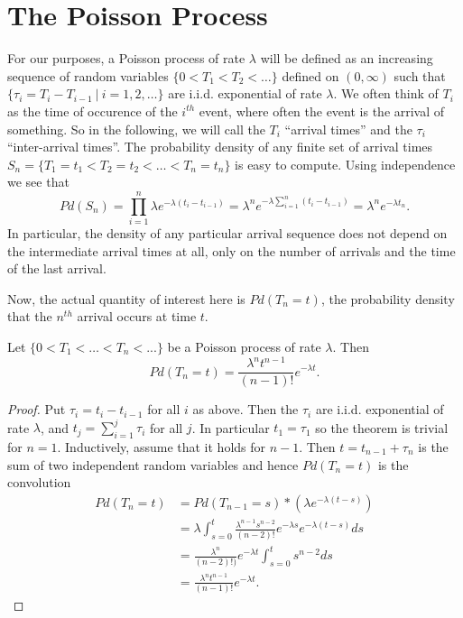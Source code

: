 \documentclass[12pt,leqno]{article}
\begin{document}
\section{The Poisson Process}
For our purposes, a Poisson process of rate $\lambda$ will be defined as an increasing sequence of random variables
$ \{0 < T_1 < T_2 < \dots\}$ defined on $(0,\infty)$ such that $\{\tau_i = T_i-T_{i-1}~|~ i = 1,2,\dots\}$ are i.i.d.
exponential of rate $\lambda$. We often think of $T_i$ as the time of occurence of the $i^{th}$
event, where often the event is the arrival of something.  So in the following, we will call the $T_i$
``arrival times'' and the $\tau_i$ ``inter-arrival times''.  The probability density of any finite set of arrival times
$S_n = \{T_1 = t_1 < T_2 = t_2<\dots<T_n = t_n\}$ is easy to compute. Using independence we see that
\begin{equation}\label{arr_seq}
Pd(S_n) = \prod_{i=1}^n\lambda{e}^{-\lambda(t_i - t_{i-1})} = \lambda^ne^{-\lambda\sum_{i = 1}^n(t_i-t_{i-1})} = \lambda^ne^{-\lambda{t_n}}.
\end{equation}
In particular, the density of any particular arrival sequence does not depend on the intermediate arrival times
at all, only on the number of arrivals and the time of the last arrival.

Now, the actual quantity of interest here
is $Pd(T_n = t)$, the probability density that the $n^{th}$ arrival occurs at time $t$.
\begin{Thm}
  Let $\{0 < T_1<\dots<T_n<... \}$ be a Poisson process of rate $\lambda$.  Then
  \begin{equation}\label{erlang}
  Pd(T_n = t) = \frac{\lambda^nt^{n-1}}{(n-1)!}e^{-\lambda{t}}.
  \end{equation}
  \begin{proof}
    Put $\tau_i = t_i - t_{i-1}$ for all $i$ as above. Then the $\tau_i$ are i.i.d. exponential of rate $\lambda$, and
    $t_j = \sum_{i=1}^j \tau_i$ for all $j$.  In particular $t_1 = \tau_1$ so the theorem is trivial for $n = 1$.
    Inductively, assume that it holds for $n-1$. Then $t = t_{n-1} + \tau_n$ is the sum of two independent random
    variables and hence $Pd(T_n = t)$ is the convolution
    \begin{align*}
      Pd(T_n = t) &= Pd(T_{n-1} = s)*({\lambda}e^{-\lambda(t-s)})\\
      &= \lambda\int_{s=0}^t\frac{\lambda^{n-1}s^{n-2}}{(n-2)!}e^{-\lambda{s}}e^{-\lambda(t-s)}ds \\
      &= \frac{\lambda^n}{(n-2)!)}e^{-\lambda{t}}\int_{s=0}^ts^{n-2}ds \\
      &= \frac{\lambda^nt^{n-1}}{(n-1)!}e^{-\lambda{t}}.
    \end{align*}
  \end{proof}
\end{Thm}
\end{document}
